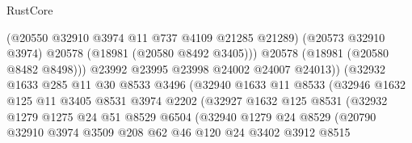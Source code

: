 \begin{lexlean}{RustCore}
\begin{coremodule}
                                      (@20550 @32910 @3974 @11 @737 @4109 @21285 @21289)
                                      (@20573 @32910 @3974)
                                      @20578
                                      (@18981 (@20580 @8492 @3405)))
                                    @20578
                                    (@18981 (@20580 @8482 @8498)))
                                  @23992
                                  @23995
                                  @23998
                                  @24002
                                  @24007
                                  @24013))
                              (@32932
                                @1633
                                @285
                                @11
                                @30
                                @8533
                                @3496
                                (@32940
                                  @1633
                                  @11
                                  @8533
                                  (@32946
                                    @1632
                                    @125
                                    @11
                                    @3405
                                    @8531
                                    @3974
                                    @2202
                                    (@32927
                                      @1632
                                      @125
                                      @8531
                                      (@32932
                                        @1279
                                        @1275
                                        @24
                                        @51
                                        @8529
                                        @6504
                                        (@32940
                                          @1279
                                          @24
                                          @8529
                                          (@20790
                                            @32910
                                            @3974
                                            @3509
                                            @208
                                            @62
                                            @46
                                            @120
                                            @24
                                            @3402
                                            @3912
                                            @8515

\end{coremodule}
\end{lexlean}
